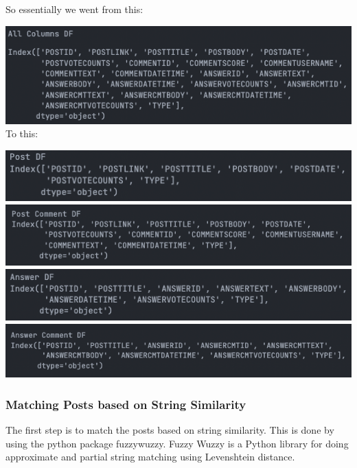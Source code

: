 \noindent So essentially we went from this: 

\noindent \includegraphics[scale=0.65]{all_columns_df.png}\\

\noindent To this:

\noindent \includegraphics[scale=0.65]{post_df.png}\\
\includegraphics[scale=0.65]{post_comments_df.png}\\
\includegraphics[scale=0.65]{answer_df.png}\\
\includegraphics[scale=0.65]{answer_comment_df.png}\\

\subsubsection{Matching Posts based on String Similarity}
The first step is to match the posts based on string similarity. This is done by using the python package fuzzywuzzy. Fuzzy Wuzzy is a Python library for doing approximate and partial string matching using Levenshtein distance. 

